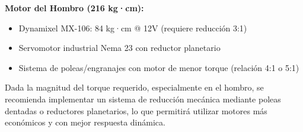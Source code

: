 \textbf{Motor del Hombro (216 kg·cm):}
\begin{itemize}
    \item Dynamixel MX-106: 84 kg·cm @ 12V (requiere reducción 3:1)
    \item Servomotor industrial Nema 23 con reductor planetario
    \item Sistema de poleas/engranajes con motor de menor torque (relación 4:1 o 5:1)
\end{itemize}

Dada la magnitud del torque requerido, especialmente en el hombro, se recomienda implementar un sistema de reducción mecánica mediante poleas dentadas o reductores planetarios, lo que permitirá utilizar motores más económicos y con mejor respuesta dinámica.





